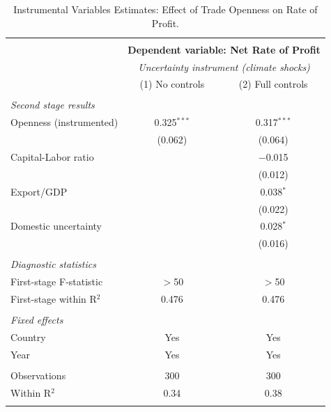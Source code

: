 \documentclass[10pt]{article}
\begin{document}
\begin{table}[!htbp]
  \centering
  \small
  \caption{Instrumental Variables Estimates: Effect of Trade Openness on Rate of Profit.}
  \label{table:iv_results}
  \begin{tabular}{@{\extracolsep{5pt}}lcc}
  \\[-1.8ex]\hline
  \hline \\[-1.8ex]
  & \multicolumn{2}{c}{\textbf{Dependent variable: Net Rate of Profit}} \\
  & \multicolumn{2}{c}{\textit{Uncertainty instrument (climate shocks)}} \\
  & (1) No controls & (2) Full controls \\
  \hline \\[-1.8ex]
  \textit{Second stage results} & & \\
  \quad Openness (instrumented) & 0.325$^{***}$ & 0.317$^{***}$ \\
  & (0.062) & (0.064) \\
  \quad Capital-Labor ratio & & $-$0.015 \\
  & & (0.012) \\
  \quad Export/GDP & & 0.038$^{*}$ \\
  & & (0.022) \\
  \quad Domestic uncertainty & & 0.028$^{*}$ \\
  & & (0.016) \\
  \\
  \textit{Diagnostic statistics} & & \\
  \quad First-stage F-statistic & $>$50 & $>$50 \\
  \quad First-stage within R$^{2}$ & 0.476 & 0.476 \\
  \\
  \textit{Fixed effects} & & \\
  \quad Country & Yes & Yes \\
  \quad Year & Yes & Yes \\
  \\
  Observations & 300 & 300 \\
  Within R$^{2}$ & 0.34 & 0.38 \\
  \hline
  \hline \\[-1.8ex]
  \end{tabular}
  \begin{minipage}{\textwidth}
  \footnotesize

\end{minipage}
\end{table}
\end{document}
